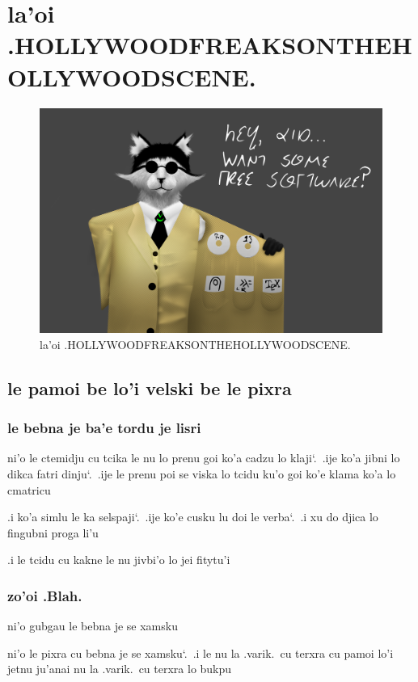 \documentclass{report}
\newcommand\sds{\spacefactor\sfcode`.\ \space}
\begin{document}
\chapter{la'oi .HOLLYWOODFREAKSONTHEHOLLYWOODSCENE.}
\begin{figure}[ht]
	\centering
	\includegraphics[keepaspectratio, width=\textwidth, height=0.75\textheight]{hollywoodfreaksonthehollywoodscene/hollywoodfreaksonthehollywoodscene.png}
	\caption[center]{la'oi .HOLLYWOODFREAKSONTHEHOLLYWOODSCENE.}
\end{figure}
\section{le pamoi be lo'i velski be le pixra}
\subsection{le bebna je ba'e tordu je lisri}
ni'o le ctemidju cu tcika le nu lo prenu goi ko'a cadzu lo klaji\sds  .ije ko'a jibni lo dikca fatri dinju\sds  .ije le prenu poi se viska lo tcidu ku'o goi ko'e klama ko'a lo cmatricu

.i ko'a simlu le ka selspaji\sds  .ije ko'e cusku lu doi le verba\sds  .i xu do djica lo fingubni proga li'u

.i le tcidu cu kakne le nu jivbi'o lo jei fitytu'i

\subsection{zo'oi .Blah.}
ni'o gubgau le bebna je se xamsku

ni'o le pixra cu bebna je se xamsku\sds  .i le nu la .varik.\ cu terxra cu pamoi lo'i jetnu ju'anai nu la .varik.\ cu terxra lo bukpu
\end{document}
